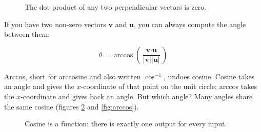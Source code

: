\begin{figure}[H]
    \centering
    \caption{The dot product of any two perpendicular vectors is zero.}
    \label{fig:perpendicular}
\end{figure}
If you have two non-zero vectors $\textbf{v}$ and $\textbf{u}$, you can always 
compute the angle between them:

$$\theta = \arccos{ \left( \frac{\textbf{v} \cdot \textbf{u}}{|\textbf{v}| 
|\textbf{u}|} \right)}$$

Arccos, short for arccosine and also written
$\cos^{-1}$, undoes cosine. Cosine takes an angle and gives the
$x$-coordinate of that point on the unit circle; arccos takes the
$x$-coordinate and gives back an angle. But which angle? Many angles share
the same cosine (figures \ref{fig:cosine-vectors} and \ref{fig:arccos}). 

\begin{figure}[H]
    \centering
        \caption{Cosine is a function: there is exactly one output for every 
        input.}
    \label{fig:cosine-vectors}
\end{figure}

